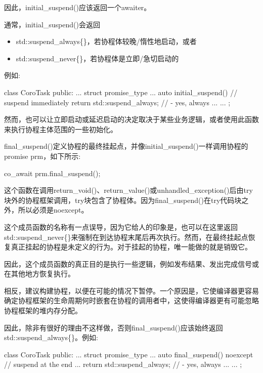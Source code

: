 因此，initial\_suspend()应该返回一个awaiter。

通常，initial\_suspend()会返回

\begin{itemize}
\item
std::suspend\_always\{\}，若协程体较晚/惰性地启动，或者

\item
std::suspend\_never\{\}，若协程体是立即/急切启动的
\end{itemize}

例如:

\begin{cpp}
class CoroTask {
	public:
	...
	struct promise_type {
		...
		auto initial_suspend() { // suspend immediately
			return std::suspend_always{}; // - yes, always
		}
		...
	}
	...
};
\end{cpp}

然而，也可以让立即启动或延迟启动的决定取决于某些业务逻辑，或者使用此函数来执行协程主体范围的一些初始化。


final\_suspend()定义协程的最终挂起点，并像initial\_suspend()一样调用协程的promise prm，如下所示:

\begin{cpp}
co_await prm.final_suspend();
\end{cpp}

这个函数在调用return\_void()、return\_value()或unhandled\_exception()后由try块外的协程框架调用，try块包含了协程体。因为final\_suspend()在try代码块之外，所以必须是noexcept。

这个成员函数的名称有一点误导，因为它给人的印象是，也可以在这里返回std::suspend\_never\{\}来强制在到达协程末尾后再次执行。然而，在最终挂起点恢复真正挂起的协程是未定义的行为。对于挂起的协程，唯一能做的就是销毁它。

因此，这个成员函数的真正目的是执行一些逻辑，例如发布结果、发出完成信号或在其他地方恢复执行。

相反，建议构建协程，以便在可能的情况下暂停。一个原因是，它使编译器更容易确定协程框架的生命周期何时嵌套在协程的调用者中，这使得编译器更有可能忽略协程框架的堆内存分配。

因此，除非有很好的理由不这样做，否则final\_suspend()应该始终返回std::suspend\_always\{\}。例如:

\begin{cpp}
class CoroTask {
	public:
	...
	struct promise_type {
		...
		auto final_suspend() noexcept { // suspend at the end
			...
			return std::suspend_always{}; // - yes, always
		}
		...
	}
	...
};
\end{cpp}

